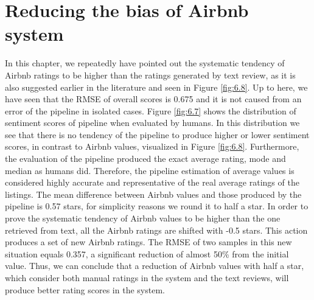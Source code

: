 \section{Reducing the bias of Airbnb system}
In this chapter, we repeatedly have pointed out the systematic tendency of Airbnb ratings to be higher than the ratings generated by text review, as it is also suggested earlier in the literature \cite{fradkin2016bias, pavlou2006institutional, pavlou2006nature} and seen in Figure \ref{fig:6.8}. Up to here, we have seen that the RMSE of overall scores is 0.675 and it is not caused from an error of the pipeline in isolated cases. 
Figure \ref{fig:6.7} shows the distribution of sentiment scores of pipeline when evaluated by humans. In this distribution we see that there is no tendency of the pipeline to produce higher or lower sentiment scores, in contrast to Airbnb values, visualized in Figure \ref{fig:6.8}. Furthermore, the evaluation of the pipeline produced the exact average rating, mode and median as humans did. Therefore, the pipeline estimation of average values is considered highly accurate and representative of the real average ratings of the listings. The mean difference between Airbnb values and those produced by the pipeline is 0.57 stars, for simplicity reasons we round it to half a star. In order to prove the systematic tendency of Airbnb values to be higher than the one retrieved from text, all the Airbnb ratings are shifted with -0.5 stars. This action produces a set of new Airbnb ratings. The RMSE of two samples in this new situation equals 0.357, a significant reduction of almost 50\% from the initial value. Thus, we can conclude that a reduction of Airbnb values with half a star, which consider both manual ratings in the system and the text reviews, will produce better rating scores in the system.

